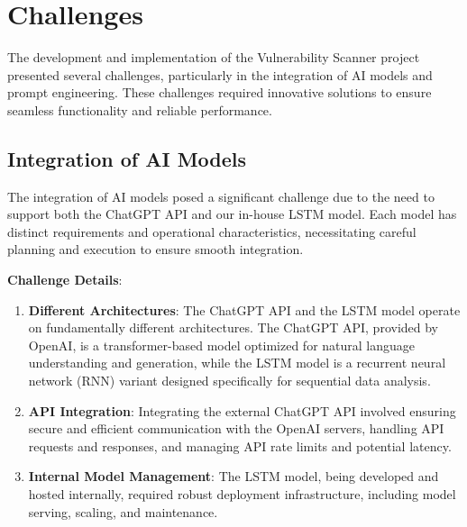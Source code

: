 \section{Challenges}
The development and implementation of the Vulnerability Scanner project presented several challenges, particularly in the integration of AI models and prompt engineering. These challenges required innovative solutions to ensure seamless functionality and reliable performance.

\subsection{Integration of AI Models}
The integration of AI models posed a significant challenge due to the need to support both the ChatGPT API and our in-house LSTM model. Each model has distinct requirements and operational characteristics, necessitating careful planning and execution to ensure smooth integration.

\textbf{Challenge Details}:

\begin{enumerate}
\item \textbf{Different Architectures}: The ChatGPT API and the LSTM model operate on fundamentally different architectures. The ChatGPT API, provided by OpenAI, is a transformer-based model optimized for natural language understanding and generation, while the LSTM model is a recurrent neural network (RNN) variant designed specifically for sequential data analysis.
\item \textbf{API Integration}: Integrating the external ChatGPT API involved ensuring secure and efficient communication with the OpenAI servers, handling API requests and responses, and managing API rate limits and potential latency.
\item \textbf{Internal Model Management}: The LSTM model, being developed and hosted internally, required robust deployment infrastructure, including model serving, scaling, and maintenance.
\end{enumerate}

